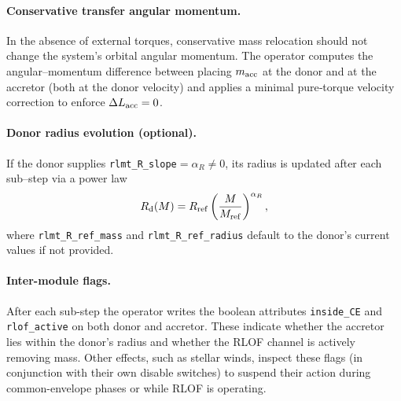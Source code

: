 \documentclass[11pt]{article}
\begin{document}
\paragraph{Conservative transfer angular momentum.}
In the absence of external torques, conservative mass relocation should not
change the system’s orbital angular momentum. The operator computes the
angular–momentum difference between placing $m_{\rm acc}$ at the donor and at
the accretor (both at the donor velocity) and applies a minimal pure‐torque
velocity correction to enforce $\Delta L_{\rm acc}=0$.

\paragraph{Donor radius evolution (optional).}
If the donor supplies \texttt{rlmt\_R\_slope}$=\alpha_R\ne0$, its radius is
updated after each sub–step via a power law
\[
R_{\rm d}(M) = R_{\rm ref}\left(\frac{M}{M_{\rm ref}}\right)^{\alpha_R},
\]
where \texttt{rlmt\_R\_ref\_mass} and \texttt{rlmt\_R\_ref\_radius} default to
the donor’s current values if not provided.

\paragraph{Inter-module flags.}
After each sub-step the operator writes the boolean attributes
\texttt{inside\_CE} and \texttt{rlof\_active} on both donor and accretor.
These indicate whether the accretor lies within the donor's radius and
whether the RLOF channel is actively removing mass. Other effects, such as
stellar winds, inspect these flags (in conjunction with their own disable
switches) to suspend their action during common-envelope phases or while
RLOF is operating.
\end{document}
